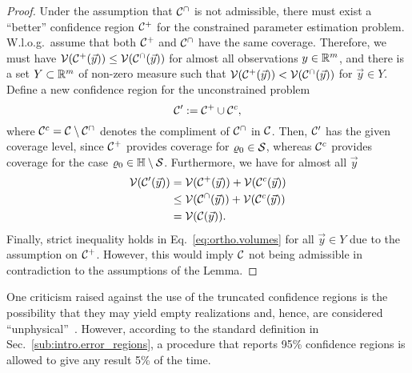 \begin{proof}
  Under the assumption that $\mathcal{C}^\cap$ is not admissible, there must exist a ``better'' confidence region $\mathcal{C}^+$ for the constrained parameter estimation problem.
  W.l.o.g.\ assume that both $\mathcal{C}^+$ and $\mathcal{C}^\cap$ have the same coverage.
  Therefore, we must have $\mathcal{V}(\mathcal{C}^+(\vec y)) \leq \mathcal{V}(\mathcal{C}^\cap(\vec y))$ for almost all observations $y \in \mathbb{R}^m$, and there is a set $Y \subset \mathbb{R}^m$ of non-zero measure such that $\mathcal{V}(\mathcal{C}^+(\vec y)) < \mathcal{V}(\mathcal{C}^\cap(\vec y))$ for $\vec y \in Y$.
  Define a new confidence region for the unconstrained problem
  \begin{equation}
    \mathcal{C}' := \mathcal{C}^+ \cup \mathcal{C}^c,
    \label{eq:ortho.new_region}
  \end{equation}
  where $\mathcal{C}^{c}=\mathcal{C}\setminus \mathcal{C}^{\cap}$ denotes the compliment of $\mathcal{C}^{\cap}$ in $\mathcal{C}$.
  Then, $\mathcal{C}'$ has the given coverage level, since $\mathcal{C}^+$ provides coverage for $\varrho_0 \in \mathcal{S}$, whereas $\mathcal{C}^c$ provides coverage for the case $\varrho_0 \in \mathbb{H} \setminus \mathcal{S}$.
  Furthermore, we have for almost all $\vec y$
  \begin{equation}
    \label{eq:ortho.volumes}
    \begin{split}
      \mathcal{V}(\mathcal{C}'(\vec y))
      &= \mathcal{V}(\mathcal{C}^+(\vec y)) + \mathcal{V}(\mathcal{C}^c(\vec y)) \\
      &\leq \mathcal{V}(\mathcal{C}^\cap(\vec y)) + \mathcal{V}(\mathcal{C}^c(\vec y)) \\
      &= \mathcal{V}(\mathcal{C}(\vec y)).
    \end{split}
  \end{equation}
  Finally, strict inequality holds in Eq.~\eqref{eq:ortho.volumes} for all $\vec y \in Y$ due to the assumption on $\mathcal{C}^+$.
  However, this would imply $\mathcal{C}$ not being admissible in contradiction to the assumptions of the Lemma.
\end{proof}

One criticism raised against the use of the truncated confidence regions is the possibility that they may yield empty realizations and, hence, are considered ``unphysical''~\cite{Feldman_1998_Unified}.
However, according to the standard definition in Sec.~\ref{sub:intro.error_regions}, a procedure that reports 95\% confidence regions is allowed to give any result 5\% of the time.

